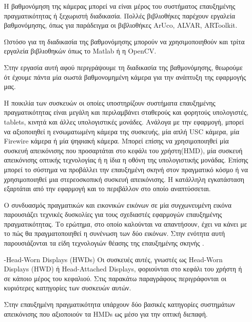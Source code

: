 Η βαθμονόμηση της κάμερας μπορεί να είναι μέρος του συστήματος επαυξημένης πραγματικότητας ή ξεχωριστή διαδικασία. Πολλές βιβλιοθήκες παρέχουν εργαλεία βαθμονόμησης, όπως για παράδειγμα οι βιβλιοθήκες ArUco, ALVAR, ARToolkit.


Ωστόσο για τη διαδικασία της βαθμονόμησης μπορούν να χρησιμοποιηθούν και τρίτα εργαλεία βιβλιοθηκών όπως το Matlab ή η OpenCV. 

Στην εργασία αυτή αφού περιγράψουμε τη διαδικασία της βαθμονόμησης, θεωρούμε ότ έχουμε πάντα μία σωστά βαθμονομημένη κάμερα για την ανάπτυξη της εφαρμογής μας.

Η ποικιλία των συσκευών οι οποίες υποστηρίζουν συστήματα επαυξημένης πραγματικότητας είναι μεγάλη και περιλαμβάνει σταθερούς και φορητούς υπολογιστές, tablets, κινητά και άλλες υπολογιστικές μονάδες. Ανάλογα με την εφαρμογή, μπορεί να αξιοποιηθεί η ενσωματωμένη κάμερα της συσκευής, μία απλή USC κάμερα, μία Firewire κάμερα ή μία ψηφιακή κάμερα. Μπορεί επίσης να χρησιμοποιηθεί μία συσκευή απεικόνισης που προσαρτάται στο κεφάλι του χρήστη(HMD), μία συσκευή απεικόνισης οπτικής τεχνολογίας ή η ίδια η οθόνη της υπολογιστικής μονάδας. Επίσης μπορεί το σύστημα να προβάλλει την επαυξημένη σκηνή στον πραγματικό κόσμο\cite{jones2013illumiroom} ή να χρησιμοποιηθεί μια στερεοσκοπική συσκευή απεικόνισης. Η κατάλληλη εγκατάσταση εξαρτάται από την εφαρμογή και το περιβάλλον στο οποίο αναπτύσσεται.









Ο συνδυασμός πραγματικών και εικονικών εικόνων σε μία συγχωνευμένη εικόνα παρουσιάζει τεχνικές δυσκολίες για τους σχεδιαστές εφαρμογών επαυξημένης πραγματικότητας.  Το ερώτημα, στο οποίο καλούνται να απαντήσουν, έχει να κάνει με το πώς θα πραγματοποιηθεί η συνένωση των δύο εικόνων. Στην ενότητα αυτή παρουσιάζονται τα είδη τεχνολογιών θέασης της επαυξημένης σκηνής \cite{azuma1997} \cite{Vallino1998}  \cite{azuma2001}.





-Head-Worn Displays (HWDs)
Οι συσκευές αυτές, γνωστές ως Head-Worn Displays (HWD) ή Head-Attached Displays, φοριούνται στο κεφάλι του χρήστη ή σε κάποιο μέρος του κεφαλιού. Στις παρακάτω παραγράφους περιγράφονται οι κυριότερες κατηγορίες των συσκευών αυτών.\cite{barfield2001fundamentals}


Στην επαυξημένη πραγματικότητα υπάρχουν δύο βασικές κατηγορίες συστημάτων απεικόνισης που αξιοποιούν τα HMDs ως μέσο για την οπτική διεπαφή. 

